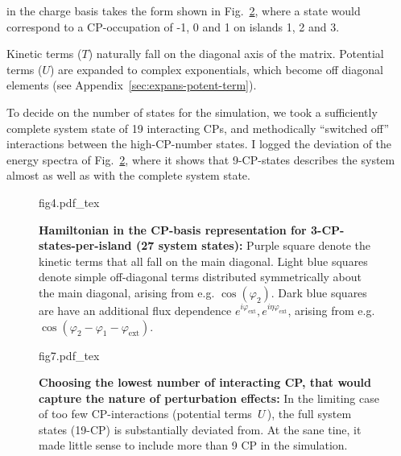 \noindent in the charge basis  takes the  form  shown in  Fig.~\ref{fig:matrix_representation}, where a state  would correspond to a CP-occupation of -1, 0 and 1 on islands 1, 2 and 3.

Kinetic terms  ($ {T}  $) naturally  fall on  the diagonal  axis of  the matrix.
Potential terms ($  U $) are expanded to complex  exponentials, which become off
diagonal elements (see Appendix~\ref{sec:expans-potent-term}).

To decide on the number of states for the simulation, we took a sufficiently complete system state of 19 interacting CPs, and methodically ``switched off'' interactions between the high-CP-number states. I logged the deviation of the energy spectra of Fig.~\ref{fig:matrix_representation}, where it shows that 9-CP-states describes the system almost as well as with the complete system state.

\begin{figure}[h]
  \centering\def\svgwidth{8cm}{fig4.pdf_tex}
  \caption{\small \textbf{Hamiltonian in the CP-basis representation for 3-CP-states-per-island (27 system states):} Purple square denote the kinetic terms that all fall on the main diagonal. Light blue squares denote simple off-diagonal terms distributed symmetrically about the main diagonal, arising from e.g. $\cos(\varphi_2)$. Dark blue squares are have an additional flux dependence $e^{i\varphi_{\text{ext}}}, e^{i\eta\varphi_{\text{ext}}}$, arising from e.g. $\cos(\varphi_2-\varphi_1-\varphi_{\text{ext}})$.
    \label{fig:matrix_representation} }
\end{figure}

\begin{figure}[h]
  \centering\def\svgwidth{8cm}{fig7.pdf_tex}
  \caption{\small \textbf{Choosing the lowest number of interacting CP, that would  capture the nature of perturbation effects:} In the limiting case of too few CP-interactions (potential terms \,$U$\,), the full system states (19-CP) is substantially deviated from. At the sane tine, it made little sense to include more than 9 CP in the simulation.
    \label{fig:matrix_representation} }
\end{figure}



